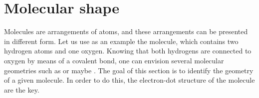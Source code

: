 \documentclass[main.tex]{subfiles}
\begin{document}
\section{Molecular shape}
Molecules are arrangements of atoms, and these arrangements can be presented in different form. Let us use as an example the  molecule, which contains two hydrogen atoms and one oxygen. Knowing that both hydrogens are connected to oxygen by means of a covalent bond, one can envision several molecular geometries such as \hspace{.05in} \hspace{.05in} or maybe \hspace{.05in}\hspace{.05in}. The goal of this section is to identify the geometry of a given molecule. In order to do this, the electron-dot structure of the molecule are the key.
\sloppy 
\end{document}
